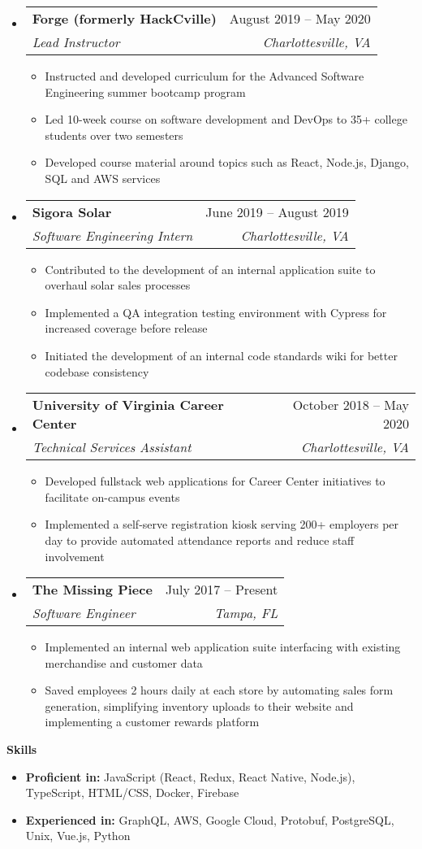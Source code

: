 \documentclass[letterpaper,12pt]{article}[leftmargin=*]
\makeatletter
\def \entryspacing {-0pt}
\renewcommand{\section}[2]{\vspace{5pt}
  \colorbox{secondary}{\color{white}\raggedbottom\normalsize\textbf{{#1}{\hspace{7pt}#2}}}
}
\newcommand{\resumeEntryStart}{\begin{itemize}[leftmargin=2.5mm]}
\newcommand{\resumeEntryEnd}{\end{itemize}\vspace{\entryspacing}}
\newcommand{\resumeItemListStart}{\begin{itemize}[leftmargin=4.5mm]}
\newcommand{\resumeItemListEnd}{\end{itemize}}
\newcommand{\resumeItem}[1]{
  \item\small{
    {#1 \vspace{-2pt}}
  }
}
\newcommand{\resumeEntryTSDL}[4]{
  \vspace{-1pt}\item[]
    \begin{tabular*}{0.97\textwidth}{l@{\extracolsep{\fill}}r}
      \textbf{\color{primary}#1} & {\firabook\color{accent}\small#2} \\
      \textit{\color{accent}\small#3} & \textit{\color{accent}\small#4} \\
    \end{tabular*}\vspace{-7pt}
}
\newcommand{\resumeEntryS}[2]{
  \item[]\small{
    \textbf{\color{primary}#1} #2\vspace{-6pt}
  }
}
\makeatother
\begin{document}
  \resumeEntryStart
    \resumeEntryTSDL
      {Forge (formerly HackCville)}
      {August 2019 -- May 2020}
      {Lead Instructor}
      {Charlottesville, VA}
    \resumeItemListStart
      \resumeItem {Instructed and developed curriculum for the Advanced Software Engineering summer bootcamp program}
      \resumeItem {Led 10-week course on software development and DevOps to 35+ college students over two semesters}
      \resumeItem {Developed course material around topics such as React, Node.js, Django, SQL and AWS services}
    \resumeItemListEnd
  \resumeEntryEnd

  \resumeEntryStart
    \resumeEntryTSDL
      {Sigora Solar}
      {June 2019 -- August 2019}
      {Software Engineering Intern}
      {Charlottesville, VA}
    \resumeItemListStart
      \resumeItem {Contributed to the development of an internal application suite to overhaul solar sales processes}
      \resumeItem {Implemented a QA integration testing environment with Cypress for increased coverage before release}
      \resumeItem {Initiated the development of an internal code standards wiki for better codebase consistency}
    \resumeItemListEnd
  \resumeEntryEnd

  \resumeEntryStart
    \resumeEntryTSDL
      {University of Virginia Career Center}
      {October 2018 -- May 2020}
      {Technical Services Assistant}
      {Charlottesville, VA}
    \resumeItemListStart
      \resumeItem {Developed fullstack web applications for Career Center initiatives to facilitate on-campus events}
      \resumeItem {Implemented a self-serve registration kiosk serving 200+ employers per day to provide automated attendance reports and reduce staff involvement}
    \resumeItemListEnd
  \resumeEntryEnd

  \resumeEntryStart
    \resumeEntryTSDL
      {The Missing Piece}
      {July 2017 -- Present}
      {Software Engineer}
      {Tampa, FL}
    \resumeItemListStart
      \resumeItem {Implemented an internal web application suite interfacing with existing merchandise and customer data}
      \resumeItem {Saved employees 2 hours daily at each store by automating sales form generation, simplifying inventory uploads to their website and implementing a customer rewards platform}
    \resumeItemListEnd
  \resumeEntryEnd

\section{\faGears}{Skills}
  \resumeEntryStart
  \resumeEntryS
    {Proficient in:}
    {JavaScript (React, Redux, React Native, Node.js), TypeScript, HTML/CSS, Docker, Firebase}
  \resumeEntryS
    {Experienced in:}
    {GraphQL, AWS, Google Cloud, Protobuf, PostgreSQL, Unix, Vue.js, Python}
  \resumeEntryEnd
\end{document}
